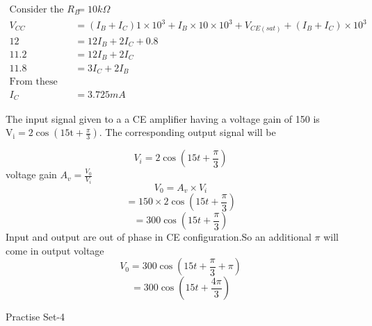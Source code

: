 \begin{enumerate}
\begin{answer}
\begin{align*}
\text{Consider the loop containing base resisitor} R_B&=10k\Omega\\
V_{CC}&=(I_B+I_C)1\times 10^3+I_B\times 10\times 10^3+V_{CE(sat)}+(I_B+I_C)\times 10^3\\
12&=12I_B+2I_C+0.8\\
11.2&=12I_B+2I_C\\
11.8&=3I_C+2I_B\\
\text{From these two equations we will get }\\
I_C&=3.725mA
\end{align*}	
\end{answer}
	\begin{minipage}{\textwidth}
	\item The input signal given to a a CE amplifier having a voltage gain of 150 is $\mathrm{V}_{\mathrm{i}}=2 \cos \left(15 \mathrm{t}+\frac{\pi}{3}\right)$. The corresponding output signal will be
\end{minipage}
\begin{answer}
$$V_i=2\cos(15t+\frac{\pi}{3})$$
voltage gain $A_v=\frac{V_0}{V_i}$
$$V_0=A_v\times V_i$$
$$=150\times 2 \cos (15t+\frac{\pi}{3})	$$
$$=300\cos (15t+\frac{\pi}{3})$$
Input and output are out of phase in CE configuration.So an additional $\pi$ will come in output voltage\\
$$V_0=300\cos (15t+\frac{\pi}{3}+\pi)$$
$$=300\cos(15t+\frac{4\pi}{3})$$
\end{answer}	
\end{enumerate}
\newpage
\begin{abox}
	Practise Set-4
\end{abox}
